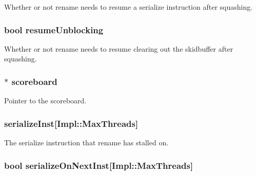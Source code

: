 \label{classDefaultRename_afa9ffeefc4b3ff8ae1ea9919bedbd1e4}
Whether or not rename needs to resume a serialize instruction after squashing. \hypertarget{classDefaultRename_aacc2e9a4766def499954195037465d42}{
\subsubsection[{resumeUnblocking}]{\setlength{\rightskip}{0pt plus 5cm}bool {\bf resumeUnblocking}}}
\label{classDefaultRename_aacc2e9a4766def499954195037465d42}
Whether or not rename needs to resume clearing out the skidbuffer after squashing. \hypertarget{classDefaultRename_a265ad15229da2a6a05f908da093b3ed5}{
\subsubsection[{scoreboard}]{$\ast$ {\bf scoreboard}}}
\label{classDefaultRename_a265ad15229da2a6a05f908da093b3ed5}
Pointer to the scoreboard. \hypertarget{classDefaultRename_a12ab5fca837718e12cc837d0f3c1da82}{
\subsubsection[{serializeInst}]{ {\bf serializeInst}\mbox{[}Impl::MaxThreads\mbox{]}}}
\label{classDefaultRename_a12ab5fca837718e12cc837d0f3c1da82}
The serialize instruction that rename has stalled on. \hypertarget{classDefaultRename_a4d99bc7f86d1a17d44e59c316c273262}{
\subsubsection[{serializeOnNextInst}]{\setlength{\rightskip}{0pt plus 5cm}bool {\bf serializeOnNextInst}\mbox{[}Impl::MaxThreads\mbox{]}}}
